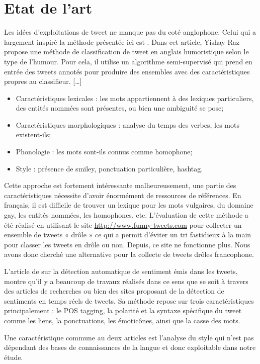 \documentclass[10pt,a4paper,twoside]{article}
\begin{document}
\section{Etat de l'art}

Les idées d’exploitations de tweet ne manque pas du coté anglophone. Celui qui a largement inspiré la méthode présentée ici est \cite{Raz12}.  Dans cet article, Yishay Raz propose une méthode de classification de tweet en anglais humoristique selon le type de l’humour. Pour cela, il utilise un algorithme semi-supervisé qui prend en entrée des tweets annotés pour produire des ensembles avec des caractéristiques propres au classifieur.  […]

\begin{itemize}
\item Caractéristiques lexicales : les mots appartiennent à des lexiques particuliers, des entités nommées sont présentes, ou bien une ambiguité se pose;
\item Caractéristiques morphologiques : analyse du temps des verbes, les mots existent-ils;
\item Phonologie : les mots sont-ils connus comme homophone;
\item Style : présence de smiley, ponctuation particulière, hashtag.
\end{itemize}
Cette approche est fortement intéressante malheureusement, une partie des caractéristiques nécessite d’avoir énormément de ressources de références. En français, il est difficile de trouver un lexique pour les mots vulgaires, du domaine gay, les entités nommées, les homophones, etc. 
L’évaluation de cette méthode a été réalisé en utilisant le site \url{ http://www.funny-tweets.com} pour collecter un ensemble de tweets « drôle » ce qui a permit d’éviter un tri fastidieux à la main pour classer les tweets en drôle ou non. Depuis, ce site ne fonctionne plus. Nous avons donc cherché une alternative pour la collecte de tweets drôles francophone.

L’article de \cite{Barbosa2010} sur la détection automatique de sentiment émis dans les tweets, montre qu’il y a beaucoup de travaux réalisés dans ce sens que se soit à travers des articles de recherches ou bien des sites proposant de la détection de sentiments en temps réels de tweets.  Sa méthode repose sur trois caractéristiques principalement : le POS tagging, la polarité et la syntaxe spécifique du tweet comme les liens, la ponctuations, les émoticônes, ainsi que la casse des mots. 

Une caractéristique commune au deux articles est l’analyse du style qui n’est pas dépendant des bases de connaissances de la langue et donc exploitable dans notre étude.
\end{document}
